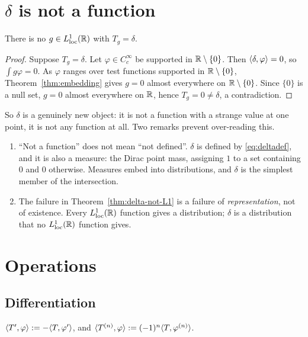 \section{\texorpdfstring{$\delta$}{delta} is not a function}

\begin{theorem}\label{thm:delta-not-L1}
There is no $g\in L^{1}_{\mathrm{loc}}(\mathbb{R})$ with $T_{g}=\delta$.
\end{theorem}

\begin{proof}
Suppose $T_{g}=\delta$. Let $\varphi\in C_{c}^{\infty}$ be supported in $\mathbb{R}\setminus\{0\}$. Then
$\langle \delta,\varphi\rangle=0$, so $\int g\varphi=0$. As $\varphi$ ranges over test functions supported in
$\mathbb{R}\setminus\{0\}$, Theorem~\ref{thm:embedding} gives $g=0$ almost everywhere on $\mathbb{R}\setminus\{0\}$.
Since $\{0\}$ is a null set, $g=0$ almost everywhere on $\mathbb{R}$, hence $T_{g}=0\neq\delta$, a
contradiction.
\end{proof}

So $\delta$ is a genuinely new object: it is not a function with a strange value at one point, it is
not any function at all. Two remarks prevent over-reading this.

\begin{enumerate}
\item ``Not a function'' does not mean ``not defined''. $\delta$ is defined by
\eqref{eq:deltadef}, and it is also a measure: the Dirac point mass, assigning $1$ to a set
containing $0$ and $0$ otherwise. Measures embed into distributions, and $\delta$ is the simplest
member of the intersection.
\item The failure in Theorem~\ref{thm:delta-not-L1} is a failure of \emph{representation}, not of
existence. Every $L^{1}_{\mathrm{loc}}(\mathbb{R})$ function gives a distribution; $\delta$ is a distribution that no
$L^{1}_{\mathrm{loc}}(\mathbb{R})$ function gives.
\end{enumerate}

\section{Operations}

\subsection*{Differentiation}

\begin{definition}
$\langle T',\varphi\rangle:=-\langle T,\varphi'\rangle$, and $\langle T^{(n)},\varphi\rangle:=(-1)^{n}\langle T,\varphi^{(n)}\rangle$.
\end{definition}

